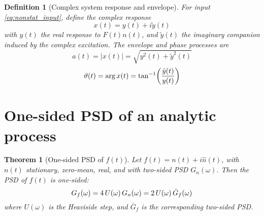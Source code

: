 \documentclass{article}
\newcommand{\tmem}[1]{{\em #1\/}}
\newtheorem{definition}{Definition}
\newtheorem{theorem}{Theorem}
\begin{document}
\begin{definition}
  [Complex system response and envelope] For input \eqref{eq:nonstat_input},
  define the complex response
  \begin{equation}
    \label{eq:complex_response} x (t) = y (t) + i \tilde{y} (t)
  \end{equation}
  with $y (t)$ the real response to $F (t) n (t)$, and $\tilde{y} (t)$ the
  imaginary companion induced by the complex excitation. The {\tmem{envelope}}
  and {\tmem{phase}} processes are
  \begin{equation}
    \label{eq:env_phase} a (t) = |x (t) | = \sqrt{y^2 (t) + \tilde{y}^2 (t)}
  \end{equation}
  \begin{equation}
    \vartheta (t) = \arg x (t) = \tan^{- 1} \hspace{-0.17em} \left(
    \frac{\tilde{y} (t)}{y (t)} \right)
  \end{equation}
\end{definition}

\section{One-sided PSD of an analytic process}

\begin{theorem}
  [One-sided PSD of $f (t)$]\label{thm:onesidedPSD} Let $f (t) = n (t) + i
  \hat{n} (t)$, with $n (t)$ stationary, zero-mean, real, and with two-sided
  PSD $G_n (\omega)$. Then the PSD of $f (t)$ is one-sided:
  \begin{equation}
    G_f (\omega) = 4 \hspace{0.17em} U (\omega)  \hspace{0.17em} G_n (\omega)
    = 2 \hspace{0.17em} U (\omega)  \hspace{0.17em} \bar{G}_f (\omega)
  \end{equation}
  where $U (\omega)$ is the Heaviside step, and $\bar{G}_f$ is the
  corresponding two-sided PSD.
\end{theorem}
\end{document}
